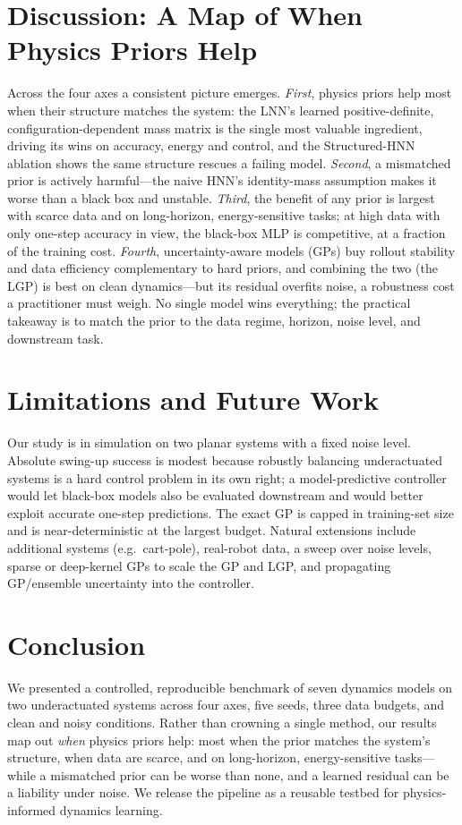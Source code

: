 \documentclass[conference]{IEEEtran}
\begin{document}
\section{Discussion: A Map of When Physics Priors Help}
Across the four axes a consistent picture emerges.
\emph{First}, physics priors help most when their structure matches the system:
the LNN's learned positive-definite, configuration-dependent mass matrix is the
single most valuable ingredient, driving its wins on accuracy, energy and control,
and the Structured-HNN ablation shows the same structure rescues a failing model.
\emph{Second}, a mismatched prior is actively harmful---the naive HNN's
identity-mass assumption makes it worse than a black box and unstable.
\emph{Third}, the benefit of any prior is largest with scarce data and on
long-horizon, energy-sensitive tasks; at high data with only one-step accuracy in
view, the black-box MLP is competitive, at a fraction of the training cost.
\emph{Fourth}, uncertainty-aware models (GPs) buy rollout stability and data
efficiency complementary to hard priors, and combining the two (the LGP) is best on
clean dynamics---but its residual overfits noise, a robustness cost a practitioner
must weigh. No single model wins everything; the practical takeaway is to match the
prior to the data regime, horizon, noise level, and downstream task.

\section{Limitations and Future Work}
Our study is in simulation on two planar systems with a fixed noise level. Absolute
swing-up success is modest because robustly balancing underactuated systems is a
hard control problem in its own right; a model-predictive controller would let
black-box models also be evaluated downstream and would better exploit accurate
one-step predictions. The exact GP is capped in training-set size and is
near-deterministic at the largest budget. Natural extensions include additional
systems (e.g.\ cart-pole), real-robot data, a sweep over noise levels, sparse or
deep-kernel GPs to scale the GP and LGP, and propagating GP/ensemble uncertainty
into the controller.

\section{Conclusion}
We presented a controlled, reproducible benchmark of seven dynamics models on two
underactuated systems across four axes, five seeds, three data budgets, and clean
and noisy conditions. Rather than crowning a single method, our results map out
\emph{when} physics priors help: most when the prior matches the system's
structure, when data are scarce, and on long-horizon, energy-sensitive tasks---
while a mismatched prior can be worse than none, and a learned residual can be a
liability under noise. We release the pipeline as a reusable testbed for
physics-informed dynamics learning.
\end{document}
